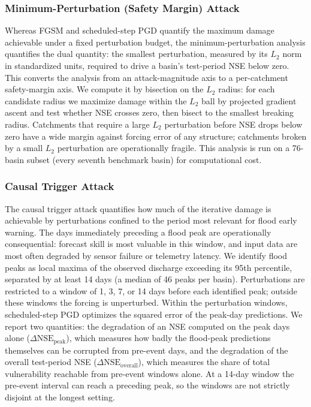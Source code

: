 \documentclass[final]{agujournal2019}
\begin{document}
\subsubsection{Minimum-Perturbation (Safety Margin) Attack}

Whereas FGSM and scheduled-step PGD quantify the maximum damage achievable under a fixed perturbation budget, the minimum-perturbation analysis quantifies the dual quantity: the smallest perturbation, measured by its $L_2$ norm in standardized units, required to drive a basin's test-period NSE below zero. This converts the analysis from an attack-magnitude axis to a per-catchment safety-margin axis. We compute it by bisection on the $L_2$ radius: for each candidate radius we maximize damage within the $L_2$ ball by projected gradient ascent and test whether NSE crosses zero, then bisect to the smallest breaking radius. Catchments that require a large $L_2$ perturbation before NSE drops below zero have a wide margin against forcing error of any structure; catchments broken by a small $L_2$ perturbation are operationally fragile. This analysis is run on a 76-basin subset (every seventh benchmark basin) for computational cost.

\subsubsection{Causal Trigger Attack}

The causal trigger attack quantifies how much of the iterative damage is achievable by perturbations confined to the period most relevant for flood early warning. The days immediately preceding a flood peak are operationally consequential: forecast skill is most valuable in this window, and input data are most often degraded by sensor failure or telemetry latency. We identify flood peaks as local maxima of the observed discharge exceeding its 95th percentile, separated by at least 14 days (a median of 46 peaks per basin). Perturbations are restricted to a window of 1, 3, 7, or 14 days before each identified peak; outside these windows the forcing is unperturbed. Within the perturbation windows, scheduled-step PGD optimizes the squared error of the peak-day predictions. We report two quantities: the degradation of an NSE computed on the peak days alone ($\Delta\mathrm{NSE}_{\mathrm{peak}}$), which measures how badly the flood-peak predictions themselves can be corrupted from pre-event days, and the degradation of the overall test-period NSE ($\Delta\mathrm{NSE}_{\mathrm{overall}}$), which measures the share of total vulnerability reachable from pre-event windows alone. At a 14-day window the pre-event interval can reach a preceding peak, so the windows are not strictly disjoint at the longest setting.
\end{document}
